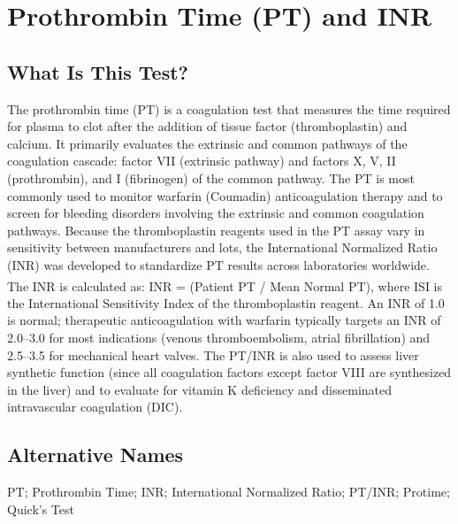 \chapter{Prothrombin Time (PT) and INR}

\section*{What Is This Test?}
The prothrombin time (PT) is a coagulation test that measures the time required for plasma to clot after the addition of tissue factor (thromboplastin) and calcium. It primarily evaluates the extrinsic and common pathways of the coagulation cascade: factor VII (extrinsic pathway) and factors X, V, II (prothrombin), and I (fibrinogen) of the common pathway. The PT is most commonly used to monitor warfarin (Coumadin) anticoagulation therapy and to screen for bleeding disorders involving the extrinsic and common coagulation pathways. Because the thromboplastin reagents used in the PT assay vary in sensitivity between manufacturers and lots, the International Normalized Ratio (INR) was developed to standardize PT results across laboratories worldwide. The INR is calculated as: INR = (Patient PT / Mean Normal PT)\textsuperscript{}, where ISI is the International Sensitivity Index of the thromboplastin reagent. An INR of 1.0 is normal; therapeutic anticoagulation with warfarin typically targets an INR of 2.0--3.0 for most indications (venous thromboembolism, atrial fibrillation) and 2.5--3.5 for mechanical heart valves. The PT/INR is also used to assess liver synthetic function (since all coagulation factors except factor VIII are synthesized in the liver) and to evaluate for vitamin K deficiency and disseminated intravascular coagulation (DIC).

\section*{Alternative Names}
PT; Prothrombin Time; INR; International Normalized Ratio; PT/INR; Protime; Quick's Test

